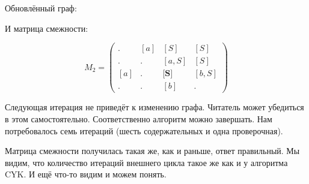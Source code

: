 \begin{example}
Обновлённый граф:
\begin{pic}
\begin{center}
\end{center}
\end{pic}

И матрица смежности:

$$ M_2 =
\begin{pmatrix} 
. & [a] & [S] & [S] \\
. & . & [a, S] & [S] \\
[a] & . & \textbf{[S]} & [b,S] \\
. & . & [b] & . 
\end{pmatrix}
$$


Следующая итерация не приведёт к изменению графа.
Читатель может убедиться в этом самостоятельно.
Соответственно алгоритм можно завершать.
Нам потребовалось семь итераций (шесть содержательных и одна проверочная).

Матрица смежности получилась такая же, как и раньше, ответ правильный.
Мы видим, что количество итераций внешнего цикла такое же как и у алгоритма CYK.
И ещё что-то видим и можем понять.

\end{example}


